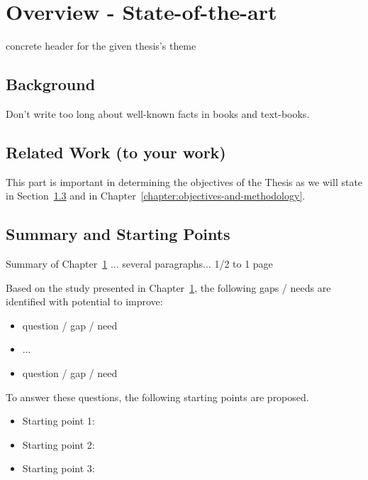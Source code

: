 \chapter{Overview - State-of-the-art}
\label{chapter:sota}

concrete header for the given thesis's theme
    \cite{goodfellow2016deep}
    \cite{keras}
    \cite{liu2021machine}

\section{Background}
\label{sec:sota-background}

Don't write too long about well-known facts in books and text-books.


\section{Related Work (to your work)}
\label{sec:sota-related}

This part is important in determining the objectives of the Thesis as we will state in Section~\ref{sec:sota-summary} and in Chapter~\ref{chapter:objectives-and-methodology}.


\section{Summary and Starting Points}
\label{sec:sota-summary}


Summary of Chapter~\ref{chapter:sota} ... several paragraphs... 1/2 to 1 page

Based on the study presented in Chapter~\ref{chapter:sota}, the following gaps / needs are identified with potential to improve:
\begin{itemize}
    \item question /  gap / need
    \item ...
    \item question /  gap / need
\end{itemize}


To answer these questions, the following starting points are proposed.
\begin{itemize}
    \item Starting point 1:
    \item Starting point 2:
    \item Starting point 3:
\end{itemize}

